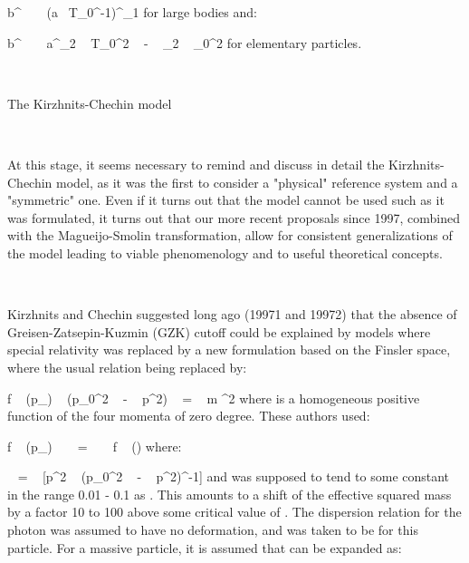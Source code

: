 \documentclass[a4paper,12pt,dvips]{article}
\makeatletter
\renewcommand{\section}{\@startsection{section}{1}{0in}
	{0.4\baselineskip}{0.1\baselineskip}{\Large\bf}}
\makeatother
\begin{document}
\equation
b^{\eta } ~ \simeq ~ (a ~T_0^{-1})^{\lambda_1 }
\endequation
\noindent
for large bodies and:

\equation
b^{\eta } ~ \simeq ~ a^{\lambda_2 } ~ T_0^{2 ~ - ~ \lambda_2 } ~ \eta _0^2
\endequation
\noindent
for elementary particles.

~ 
~ 

\section{The Kirzhnits-Chechin model}
\label{kiche.sec}

~ 

At this stage, it seems necessary to remind and discuss in detail the Kirzhnits-Chechin model, as it was the first to consider a "physical" reference system and a "symmetric" one. Even if it turns out that the model cannot be used such as it was formulated, it turns out that our more recent proposals since 1997, combined with the Magueijo-Smolin transformation, allow for consistent generalizations of the model leading to viable phenomenology and to useful theoretical concepts.

~ 

Kirzhnits and Chechin suggested long ago (19971 and 19972) that the absence of Greisen-Zatsepin-Kuzmin (GZK) cutoff could be explained by models where special relativity was replaced by a new formulation based on the Finsler space, where the usual relation \coordHE{} being replaced by:

\equation
f ~ (p_{\alpha}) ~ (p_{0}^2 ~ - ~ p^2) ~ = ~ m ^2
\endequation
\noindent
where \coordHE{} is a homogeneous positive function of the four momenta of zero degree. These authors used:

\equation
f ~ (p_{\alpha}) ~ ~ = ~ ~ f ~ (\xi )
\endequation
\noindent
where:

\equation
\xi ~ = ~ [p^2 ~ (p_{0}^2 ~ - ~ p^2)^{-1}]
\endequation
\noindent
{}\coordHE{} and \coordHE{} was supposed to tend to some constant \coordHE{} in the range 0.01 - 0.1 as \myHighlight{$\xi ~ \rightarrow ~ \infty $}\coordHE{} . This amounts to a shift of the effective squared mass by a factor 10 to 100 above some critical value of \myHighlight{$\xi $}\coordHE{} . The dispersion relation for the photon was assumed to have no deformation, and \coordHE{} was taken to be \coordHE{} for this particle. For a massive particle, it is assumed that \coordHE{} can be expanded as: 
\end{document}
